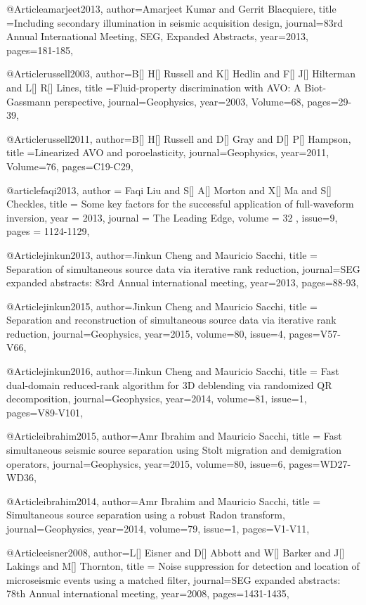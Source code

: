 @Article{amarjeet2013,
  author={Amarjeet Kumar and Gerrit Blacquiere},
  title ={Including secondary illumination in seismic acquisition design},
  journal={83rd Annual International Meeting, SEG, Expanded Abstracts},
  year=2013,
  pages={181-185},
}

@Article{russell2003,
  author={B[] H[] Russell and K[] Hedlin and F[] J[] Hilterman and L[] R[] Lines},
  title ={Fluid-property discrimination with AVO: A Biot-Gassmann perspective},
  journal={Geophysics},
  year=2003,
  Volume=68,
  pages={29-39},
}

@Article{russell2011,
  author={B[] H[] Russell and D[] Gray and D[] P[] Hampson},
  title ={Linearized AVO and poroelasticity},
  journal={Geophysics},
  year=2011,
  Volume=76,
  pages={C19-C29},
}

@article{faqi2013,
  author =	 {Faqi Liu and S[] A[] Morton and X[] Ma and S[] Checkles},
  title =	 {Some key factors for the successful application of full-waveform inversion},
  year =	 2013,
  journal =	 {The Leading Edge},
  volume = 32	 ,
  issue=9,
  pages =	 {1124-1129},
}


@Article{jinkun2013,
  author={Jinkun Cheng and Mauricio Sacchi},
  title = {Separation of simultaneous source data via iterative rank reduction},
  journal={SEG expanded abstracts: 83rd Annual international meeting},
  year=2013,
  pages={88-93},
}

@Article{jinkun2015,
  author={Jinkun Cheng and Mauricio Sacchi},
  title = {Separation and reconstruction of simultaneous source data via iterative rank reduction},
  journal={Geophysics},
  year=2015,
  volume=80,
  issue=4,
  pages={V57-V66},
}

@Article{jinkun2016,
  author={Jinkun Cheng and Mauricio Sacchi},
  title = {Fast dual-domain reduced-rank algorithm for 3{D} deblending via randomized QR decomposition},
  journal={Geophysics},
  year=2014,
  volume=81,
  issue=1,
  pages={V89-V101},
}

@Article{ibrahim2015,
  author={Amr Ibrahim and Mauricio Sacchi},
  title = {Fast simultaneous seismic source separation using Stolt migration and demigration operators},
  journal={Geophysics},
  year=2015,
  volume=80,
  issue=6,
  pages={WD27-WD36},
}

@Article{ibrahim2014,
  author={Amr Ibrahim and Mauricio Sacchi},
  title = {Simultaneous source separation using a robust {R}adon transform},
  journal={Geophysics},
  year=2014,
  volume=79,
  issue=1,
  pages={V1-V11},
}


@Article{eisner2008,
  author={L[] Eisner and D[] Abbott and W[] Barker and J[] Lakings and M[] Thornton},
  title = {Noise suppression for detection and location of microseismic events using a matched filter},
  journal={SEG expanded abstracts: 78th Annual international meeting},
  year=2008,
  pages={1431-1435},
}

